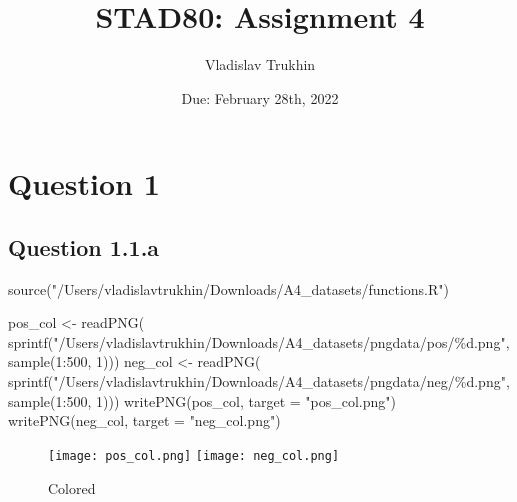 \documentclass[
]{article}
\title{STAD80: Assignment 4}
\author{Vladislav Trukhin}
\date{Due: February 28th, 2022}
\newenvironment{Shaded}{\begin{snugshade}}{\end{snugshade}}
\newcommand{\AttributeTok}[1]{\textcolor[rgb]{0.77,0.63,0.00}{#1}}
\newcommand{\DecValTok}[1]{\textcolor[rgb]{0.00,0.00,0.81}{#1}}
\newcommand{\FunctionTok}[1]{\textcolor[rgb]{0.00,0.00,0.00}{#1}}
\newcommand{\NormalTok}[1]{#1}
\newcommand{\OtherTok}[1]{\textcolor[rgb]{0.56,0.35,0.01}{#1}}
\newcommand{\SpecialCharTok}[1]{\textcolor[rgb]{0.00,0.00,0.00}{#1}}
\newcommand{\StringTok}[1]{\textcolor[rgb]{0.31,0.60,0.02}{#1}}
\begin{document}
\maketitle

{
\setcounter{tocdepth}{2}
\tableofcontents
}
\hypertarget{question-1}{%
\section{Question 1}\label{question-1}}

\hypertarget{question-1.1.a}{%
\subsection{Question 1.1.a}\label{question-1.1.a}}

\begin{Shaded}
\begin{Highlighting}[]
\FunctionTok{source}\NormalTok{(}\StringTok{"/Users/vladislavtrukhin/Downloads/A4\_datasets/functions.R"}\NormalTok{)}
\end{Highlighting}
\end{Shaded}

\begin{Shaded}
\begin{Highlighting}[]
\NormalTok{pos\_col }\OtherTok{\textless{}{-}} \FunctionTok{readPNG}\NormalTok{(}
  \FunctionTok{sprintf}\NormalTok{(}\StringTok{"/Users/vladislavtrukhin/Downloads/A4\_datasets/pngdata/pos/\%d.png"}\NormalTok{, }\FunctionTok{sample}\NormalTok{(}\DecValTok{1}\SpecialCharTok{:}\DecValTok{500}\NormalTok{, }\DecValTok{1}\NormalTok{)))}
\NormalTok{neg\_col }\OtherTok{\textless{}{-}} \FunctionTok{readPNG}\NormalTok{(}
  \FunctionTok{sprintf}\NormalTok{(}\StringTok{"/Users/vladislavtrukhin/Downloads/A4\_datasets/pngdata/neg/\%d.png"}\NormalTok{, }\FunctionTok{sample}\NormalTok{(}\DecValTok{1}\SpecialCharTok{:}\DecValTok{500}\NormalTok{, }\DecValTok{1}\NormalTok{)))}
\FunctionTok{writePNG}\NormalTok{(pos\_col, }\AttributeTok{target =} \StringTok{"pos\_col.png"}\NormalTok{)}
\FunctionTok{writePNG}\NormalTok{(neg\_col, }\AttributeTok{target =} \StringTok{"neg\_col.png"}\NormalTok{)}
\end{Highlighting}
\end{Shaded}

\begin{figure}
  \texttt{[image: pos\_col.png]}
  \texttt{[image: neg\_col.png]}
  \caption{Colored}
\end{figure}
\end{document}
